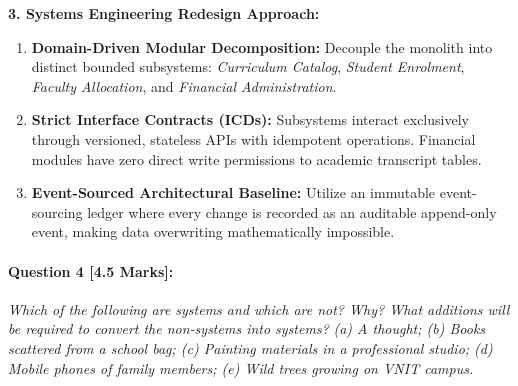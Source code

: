 \begin{tcolorbox}[colback=white,colframe=seSecondary,title={\small \textbf{Model Solution for Q3 (W24 Midsem):}}]
\textbf{3. Systems Engineering Redesign Approach:}
\begin{enumerate}[label=(\alph*), itemsep=1pt]
    \item \textbf{Domain-Driven Modular Decomposition:} Decouple the monolith into distinct bounded subsystems: \textit{Curriculum Catalog}, \textit{Student Enrolment}, \textit{Faculty Allocation}, and \textit{Financial Administration}.
    \item \textbf{Strict Interface Contracts (ICDs):} Subsystems interact exclusively through versioned, stateless APIs with idempotent operations. Financial modules have zero direct write permissions to academic transcript tables.
    \item \textbf{Event-Sourced Architectural Baseline:} Utilize an immutable event-sourcing ledger where every change is recorded as an auditable append-only event, making data overwriting mathematically impossible.
\end{enumerate}
\end{tcolorbox}

\vspace{0.8em}
\paragraph{Question 4 [4.5 Marks]:}
\textit{Which of the following are systems and which are not? Why? What additions will be required to convert the non-systems into systems?}
\textit{(a) A thought; (b) Books scattered from a school bag; (c) Painting materials in a professional studio; (d) Mobile phones of family members; (e) Wild trees growing on VNIT campus.}

